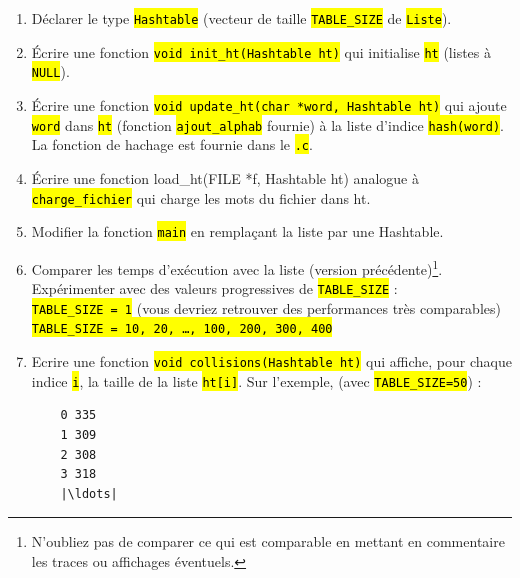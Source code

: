 \documentclass[final, pdftex, a4paper, openbib, ]{article}
\let\OldTexttt\texttt
\renewcommand{\texttt}[1]{\OldTexttt{\hl{#1}}}
\begin{document}
\begin{enumerate}
	\item Déclarer le type \texttt{Hashtable} (vecteur de taille \texttt{TABLE\_SIZE} de \texttt{Liste}).
	\item Écrire une fonction \texttt{void init\_ht(Hashtable ht)} qui initialise \texttt{ht} (listes à \texttt{NULL}).
	\item Écrire une fonction \texttt{void update\_ht(char *word, Hashtable ht)} qui ajoute \texttt{word} dans \texttt{ht} (fonction \texttt{ajout\_alphab} fournie) à la liste d'indice \texttt{hash(word)}.
	La fonction de hachage est fournie dans le \texttt{.c}.
	\item Écrire une fonction load\_ht(FILE *f, Hashtable ht) analogue à \texttt{charge\_fichier} qui charge les mots du fichier dans ht.
	\item Modifier la fonction \texttt{main} en remplaçant la liste par une Hashtable.
	\item Comparer les temps d'exécution avec la liste (version précédente)\footnote{N'oubliez pas de comparer ce qui est comparable en mettant en commentaire les traces ou affichages éventuels.}. Expérimenter avec des valeurs progressives de \texttt{TABLE\_SIZE} :\\
	\texttt{TABLE\_SIZE = 1} (vous devriez retrouver des performances très comparables)\\
	\texttt{TABLE\_SIZE = 10, 20, \ldots, 100, 200, 300, 400}
	\item Ecrire une fonction \texttt{void collisions(Hashtable ht)} qui affiche, pour chaque indice \texttt{i}, la taille de la liste \texttt{ht[i]}.
	Sur l'exemple, (avec \texttt{TABLE\_SIZE=50}) : %

	\begin{verbatim}
	0 335
	1 309
	2 308
	3 318
	|\ldots|
	\end{verbatim}
	
\end{enumerate}
\end{document}
